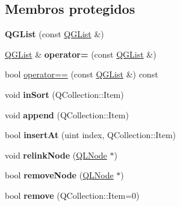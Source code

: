 \subsection*{Membros protegidos}
\begin{DoxyCompactItemize}
\item 
\hypertarget{class_q_g_list_a86bc37a69fa7213b9f8ed6fad78a50ee}{{\bfseries Q\-G\-List} (const \hyperlink{class_q_g_list}{Q\-G\-List} \&)}\label{class_q_g_list_a86bc37a69fa7213b9f8ed6fad78a50ee}

\item 
\hypertarget{class_q_g_list_ae2db7a09a5da56c838857a98ebd8b938}{\hyperlink{class_q_g_list}{Q\-G\-List} \& {\bfseries operator=} (const \hyperlink{class_q_g_list}{Q\-G\-List} \&)}\label{class_q_g_list_ae2db7a09a5da56c838857a98ebd8b938}

\item 
bool \hyperlink{class_q_g_list_a16886f83ef8aab3bcd0dc16d7b2d5434}{operator==} (const \hyperlink{class_q_g_list}{Q\-G\-List} \&) const 
\item 
\hypertarget{class_q_g_list_a76ab50c1f6a3fc5716178ad159328826}{void {\bfseries in\-Sort} (Q\-Collection\-::\-Item)}\label{class_q_g_list_a76ab50c1f6a3fc5716178ad159328826}

\item 
\hypertarget{class_q_g_list_af104b0a12bc58797e843f11e9b8e3358}{void {\bfseries append} (Q\-Collection\-::\-Item)}\label{class_q_g_list_af104b0a12bc58797e843f11e9b8e3358}

\item 
\hypertarget{class_q_g_list_a8034994c757205db2fc47550b45f7372}{bool {\bfseries insert\-At} (uint index, Q\-Collection\-::\-Item)}\label{class_q_g_list_a8034994c757205db2fc47550b45f7372}

\item 
\hypertarget{class_q_g_list_a5b88e69a11e6ca58ff54c746d6752808}{void {\bfseries relink\-Node} (\hyperlink{class_q_l_node}{Q\-L\-Node} $\ast$)}\label{class_q_g_list_a5b88e69a11e6ca58ff54c746d6752808}

\item 
\hypertarget{class_q_g_list_adadc5ee841a15434c3480a04cf041a5b}{bool {\bfseries remove\-Node} (\hyperlink{class_q_l_node}{Q\-L\-Node} $\ast$)}\label{class_q_g_list_adadc5ee841a15434c3480a04cf041a5b}

\item 
\hypertarget{class_q_g_list_a219159938a014b3d158b65f5cabbca7e}{bool {\bfseries remove} (Q\-Collection\-::\-Item=0)}\label{class_q_g_list_a219159938a014b3d158b65f5cabbca7e}


\end{DoxyCompactItemize}
